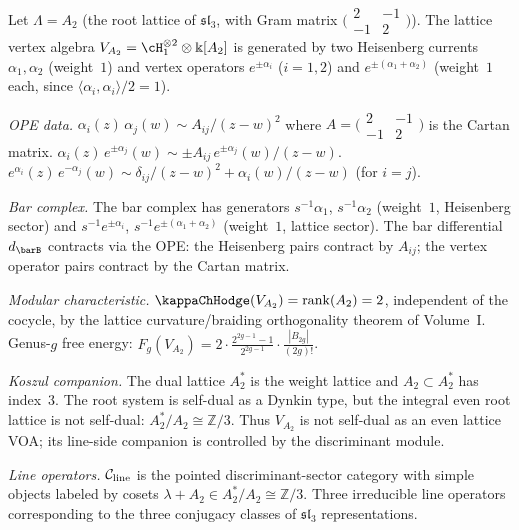 \begin{computation}
\label{comp:lattice-rank2-holographic}
Let $\Lambda=A_2$ (the root lattice of $\mathfrak{sl}_3$,
with Gram matrix $\bigl(\begin{smallmatrix}2&-1\\-1&2
\end{smallmatrix}\bigr)$).
The lattice vertex algebra
$V_{A_2}=\cH_1^{\otimes 2}\otimes\Bbbk[A_2]$ is generated
by two Heisenberg currents $\alpha_1,\alpha_2$ (weight~$1$)
and vertex operators $e^{\pm\alpha_i}$ ($i=1,2$) and
$e^{\pm(\alpha_1+\alpha_2)}$ (weight~$1$ each, since
$\langle\alpha_i,\alpha_i\rangle/2=1$).

\emph{OPE data.}
$\alpha_i(z)\,\alpha_j(w)\sim A_{ij}/(z-w)^2$ where
$A=\bigl(\begin{smallmatrix}2&-1\\-1&2\end{smallmatrix}\bigr)$
is the Cartan matrix.
$\alpha_i(z)\,e^{\pm\alpha_j}(w)\sim\pm A_{ij}\,e^{\pm\alpha_j}(w)/(z-w)$.
$e^{\alpha_i}(z)\,e^{-\alpha_j}(w)\sim
\delta_{ij}/(z-w)^2+\alpha_i(w)/(z-w)$ (for $i=j$).

\emph{Bar complex.}
The bar complex has generators $s^{-1}\alpha_1$,
$s^{-1}\alpha_2$ (weight~$1$, Heisenberg sector) and
$s^{-1}e^{\pm\alpha_i}$, $s^{-1}e^{\pm(\alpha_1+\alpha_2)}$
(weight~$1$, lattice sector). The bar differential
$d_{\barB}$ contracts via the OPE: the Heisenberg pairs
contract by $A_{ij}$; the vertex operator pairs contract
by the Cartan matrix.

\emph{Modular characteristic.}
$\kappaChHodge(V_{A_2})=\operatorname{rank}(A_2)=2$, independent
of the cocycle, by the lattice curvature/braiding orthogonality
theorem of Volume~I.
Genus-$g$ free energy:
$F_g(V_{A_2})=2\cdot \tfrac{2^{2g-1}-1}{2^{2g-1}}\cdot\tfrac{|B_{2g}|}{(2g)!}$.

\emph{Koszul companion.}
The dual lattice $A_2^*$ is the weight lattice and
$A_2\subset A_2^*$ has index~$3$. The root system is self-dual as a
Dynkin type, but the integral even root lattice is not self-dual:
$A_2^*/A_2\cong\mathbb Z/3$. Thus $V_{A_2}$ is not self-dual as an
even lattice VOA; its line-side companion is controlled by the
discriminant module.

\emph{Line operators.}
$\mathcal C_{\mathrm{line}}$ is the pointed discriminant-sector category with
simple objects labeled by cosets
$\lambda+A_2\in A_2^*/A_2\cong\mathbb Z/3$.
Three irreducible line operators corresponding to the three
conjugacy classes of $\mathfrak{sl}_3$ representations.
\end{computation}

